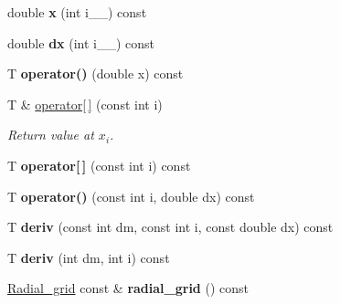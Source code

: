 \begin{DoxyCompactItemize}
\item 
\hypertarget{classsirius_1_1_spline_a795f6dc988ea4796b72f657a323792c9}{}double {\bfseries x} (int i\+\_\+\+\_\+) const \label{classsirius_1_1_spline_a795f6dc988ea4796b72f657a323792c9}

\item 
\hypertarget{classsirius_1_1_spline_a18453fe5c4c72e2bc40408aa94e36bd1}{}double {\bfseries dx} (int i\+\_\+\+\_\+) const \label{classsirius_1_1_spline_a18453fe5c4c72e2bc40408aa94e36bd1}

\item 
\hypertarget{classsirius_1_1_spline_a6a225d33a946ec846661b678ad315001}{}T {\bfseries operator()} (double x) const \label{classsirius_1_1_spline_a6a225d33a946ec846661b678ad315001}

\item 
T \& \hyperlink{classsirius_1_1_spline_a0d6773307bef5f0e6015f7f00ec09835}{operator\mbox{[}$\,$\mbox{]}} (const int i)
\begin{DoxyCompactList}\small\item\em Return value at $ x_i $. \end{DoxyCompactList}\item 
\hypertarget{classsirius_1_1_spline_aefbf732ef6a645ad3afadfed5a2cc3f1}{}T {\bfseries operator\mbox{[}$\,$\mbox{]}} (const int i) const \label{classsirius_1_1_spline_aefbf732ef6a645ad3afadfed5a2cc3f1}

\item 
\hypertarget{classsirius_1_1_spline_a4f50afc43a6253dcbe927087cc8ea879}{}T {\bfseries operator()} (const int i, double dx) const \label{classsirius_1_1_spline_a4f50afc43a6253dcbe927087cc8ea879}

\item 
\hypertarget{classsirius_1_1_spline_a1be58b7a6d09c9377c17f0e3e2642da8}{}T {\bfseries deriv} (const int dm, const int i, const double dx) const \label{classsirius_1_1_spline_a1be58b7a6d09c9377c17f0e3e2642da8}

\item 
\hypertarget{classsirius_1_1_spline_a362c30d54bd84f4ff20aeab0d4b5148f}{}T {\bfseries deriv} (int dm, int i) const \label{classsirius_1_1_spline_a362c30d54bd84f4ff20aeab0d4b5148f}

\item 
\hypertarget{classsirius_1_1_spline_a75e15604a018849f2be93fbbbe71cb33}{}\hyperlink{classsirius_1_1_radial__grid}{Radial\+\_\+grid} const \& {\bfseries radial\+\_\+grid} () const \label{classsirius_1_1_spline_a75e15604a018849f2be93fbbbe71cb33}


\end{DoxyCompactItemize}
